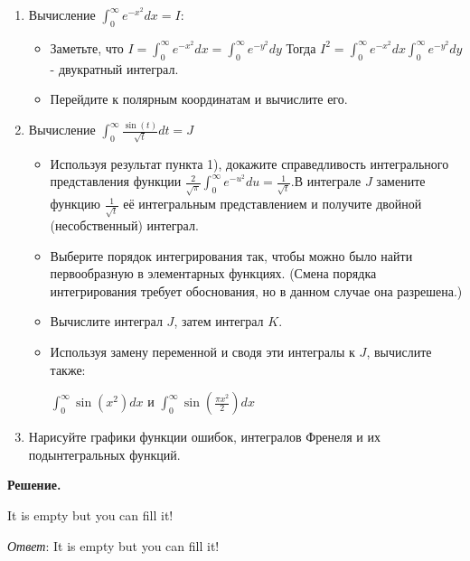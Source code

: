 \begin{enumerate}
    \item Вычисление $\int^\infty_0 e^{-x^2} dx = I$:
    \begin{itemize}
        \item Заметьте, что $\displaystyle I = \int^\infty_0 e^{-x^2} dx = \int_0^\infty e^{-y^2} dy$
        Тогда $\displaystyle I^2 = \int^\infty_0 e^{-x^2} dx \int_0^\infty e^{-y^2} dy$ - двукратный интеграл.

        \item Перейдите к полярным координатам и вычислите его.
    \end{itemize}

    \item Вычисление $\displaystyle \int_0^\infty \frac{\sin(t)}{\sqrt{t}} dt = J$
    \begin{itemize}
        \item Используя результат пункта 1), докажите справедливость интегрального представления функции
        $\displaystyle \frac{2}{\sqrt{\pi}} \int_0^\infty e^{-u^2} du = \frac{1}{\sqrt{t}}$.В интеграле $J$ замените функцию $\frac{1}{\sqrt{t}}$ её интегральным представлением и получите двойной (несобственный) интеграл.

        \item Выберите порядок интегрирования так, чтобы можно было найти первообразную в элементарных функциях.
        (Смена порядка интегрирования требует обоснования, но в данном случае она разрешена.)

        \item Вычислите интеграл $J$, затем интеграл $K$.

        \item Используя замену переменной и сводя эти интегралы к $J$, вычислите также:

        $\displaystyle \int_0^\infty \sin(x^2) dx$ и $\displaystyle \int_0^\infty \sin(\frac{\pi x^2}{2}) dx$

    \end{itemize}

    \item Нарисуйте графики функции ошибок, интегралов Френеля и их подынтегральных функций.

\end{enumerate}

\vspace{10mm}
\textbf{Решение.}

It is empty but you can fill it!

\textit{Ответ}: It is empty but you can fill it!
\clearpage

